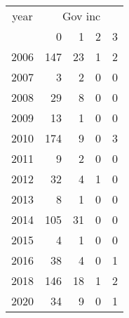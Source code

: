 \footnotesize\begin{tabular}[t]{lrrrr}
\toprule
\multicolumn{1}{c}{year} & \multicolumn{4}{c}{Gov inc} \\
\cmidrule(l{3pt}r{3pt}){1-1} \cmidrule(l{3pt}r{3pt}){2-5}
  & 0 & 1 & 2 & 3\\
\midrule
2006 & 147 & 23 & 1 & 2\\
2007 & 3 & 2 & 0 & 0\\
2008 & 29 & 8 & 0 & 0\\
2009 & 13 & 1 & 0 & 0\\
2010 & 174 & 9 & 0 & 3\\
2011 & 9 & 2 & 0 & 0\\
2012 & 32 & 4 & 1 & 0\\
2013 & 8 & 1 & 0 & 0\\
2014 & 105 & 31 & 0 & 0\\
2015 & 4 & 1 & 0 & 0\\
2016 & 38 & 4 & 0 & 1\\
2018 & 146 & 18 & 1 & 2\\
2020 & 34 & 9 & 0 & 1\\
\bottomrule
\end{tabular}
